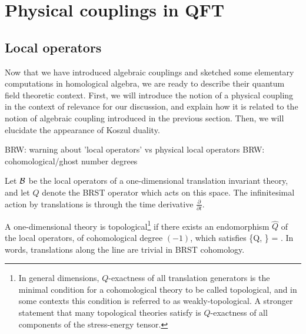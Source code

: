 \documentclass[11pt]{amsart}
\def\brian#1{{\textcolor{blue!65!red}{BRW: {#1}}}}
\begin{document}
\section{Physical couplings in QFT}\label{s:lagcoupling}


\subsection{Local operators}

Now that we have introduced algebraic couplings and sketched some elementary computations in homological algebra, we are ready to describe their quantum field theoretic context. First, we will introduce the notion of a physical coupling in the context of relevance for our discussion, and explain how it is related to the notion of algebraic coupling introduced in the previous section. Then, we will elucidate the appearance of Koszul duality. 

\brian{warning about 'local operators' vs physical local operators}
\brian{cohomological/ghost number degrees}

Let $\mathcal B$ be the local operators of a one-dimensional translation invariant theory, and let $Q$ denote the BRST operator which acts on this space. 
The infinitesimal action by translations is through the time derivative $\frac{\partial}{\partial t}$. 

A one-dimensional theory is topological\footnote{In general dimensions, $Q$-exactness of all translation generators is the minimal condition for a cohomological theory to be called topological, and in some contexts this condition is referred to as weakly-topological. A stronger statement that many topological theories satisfy is $Q$-exactness of all components of the stress-energy tensor.} if there exists an endomorphism $\hat{Q}$ of the local operators, of cohomological degree $(-1)$, which satisfies
\beqn\label{eqn:triv}
\{Q, \} =  .
\eeqn
In words, translations along the line are trivial in BRST cohomology. 
\end{document}
